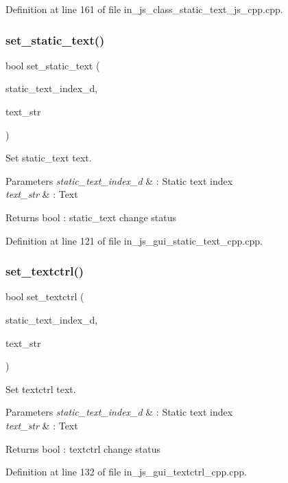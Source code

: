 Definition at line 161 of file in\+\_\+js\+\_\+class\+\_\+static\+\_\+text\+\_\+js\+\_\+cpp.\+cpp.

\mbox{\label{group___static__text_gaeb645371bf2c428258dc6e3c08b6f523}} 
\subsubsection{set\_static\_text()}
{\footnotesize\ttfamily bool set\+\_\+static\+\_\+text (\begin{DoxyParamCaption}\item[{double}]{static\+\_\+text\+\_\+index\+\_\+d,  }\item[{wx\+String}]{text\+\_\+str }\end{DoxyParamCaption})}



Set static\+\_\+text text. 


\begin{DoxyParams}{Parameters}
{\em static\+\_\+text\+\_\+index\+\_\+d} & \+: Static text index \\
\hline
{\em text\+\_\+str} & \+: Text \\
\hline
\end{DoxyParams}
\begin{DoxyReturn}{Returns}
bool \+: static\+\_\+text change status 
\end{DoxyReturn}


Definition at line 121 of file in\+\_\+js\+\_\+gui\+\_\+static\+\_\+text\+\_\+cpp.\+cpp.

\mbox{\label{group___static__text_gac548fb78081658e2d6ac4e0480210e59}} 
\subsubsection{set\_textctrl()}
{\footnotesize\ttfamily bool set\+\_\+textctrl (\begin{DoxyParamCaption}\item[{double}]{static\+\_\+text\+\_\+index\+\_\+d,  }\item[{wx\+String}]{text\+\_\+str }\end{DoxyParamCaption})}



Set textctrl text. 


\begin{DoxyParams}{Parameters}
{\em static\+\_\+text\+\_\+index\+\_\+d} & \+: Static text index \\
\hline
{\em text\+\_\+str} & \+: Text \\
\hline
\end{DoxyParams}
\begin{DoxyReturn}{Returns}
bool \+: textctrl change status 
\end{DoxyReturn}


Definition at line 132 of file in\+\_\+js\+\_\+gui\+\_\+textctrl\+\_\+cpp.\+cpp.


